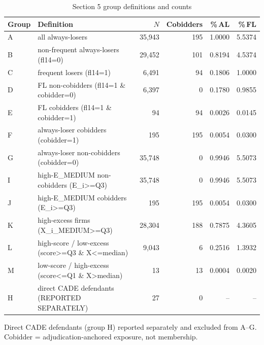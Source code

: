 \begin{table}[htbp]\centering
\caption{Section 5 group definitions and counts}
\label{tab:s5_group_counts}
\begin{tabular}{llrrrr}\hline
Group & Definition & $N$ & Cobidders & \%\,AL & \%\,FL \\\hline
A & all always-losers & 35,943 & 195 & 1.0000 & 5.5374 \\
B & non-frequent always-losers (fl14=0) & 29,452 & 101 & 0.8194 & 4.5374 \\
C & frequent losers (fl14=1) & 6,491 &  94 & 0.1806 & 1.0000 \\
D & FL non-cobidders (fl14=1 \& cobidder=0) & 6,397 &   0 & 0.1780 & 0.9855 \\
E & FL cobidders (fl14=1 \& cobidder=1) & 94 &  94 & 0.0026 & 0.0145 \\
F & always-loser cobidders (cobidder=1) & 195 & 195 & 0.0054 & 0.0300 \\
G & always-loser non-cobidders (cobidder=0) & 35,748 &   0 & 0.9946 & 5.5073 \\
I & high-E\_MEDIUM non-cobidders (E\_i>=Q3) & 35,748 &   0 & 0.9946 & 5.5073 \\
J & high-E\_MEDIUM cobidders (E\_i>=Q3) & 195 & 195 & 0.0054 & 0.0300 \\
K & high-excess firms (X\_i\_MEDIUM>=Q3) & 28,304 & 188 & 0.7875 & 4.3605 \\
L & high-score / low-excess (score>=Q3 \& X<=median) & 9,043 &   6 & 0.2516 & 1.3932 \\
M & low-score / high-excess (score<=Q1 \& X>median) & 13 &  13 & 0.0004 & 0.0020 \\
H & direct CADE defendants (REPORTED SEPARATELY) & 27 &   0 & -- & -- \\
\hline\end{tabular}
\begin{tablenotes}\footnotesize\item Direct CADE defendants (group H) reported separately and excluded from A--G. Cobidder = adjudication-anchored exposure, not membership.\end{tablenotes}
\end{table}
